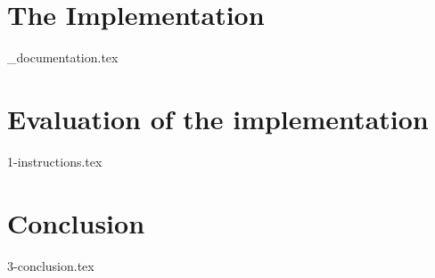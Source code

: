 \documentclass[UKenglish]{ifimaster}
\begin{document}
\chapter{The Implementation}
{_documentation.tex}

\chapter{Evaluation of the implementation}
{1-instructions.tex}

\chapter{Conclusion}
{3-conclusion.tex}

\backmatter{}


\end{document}
